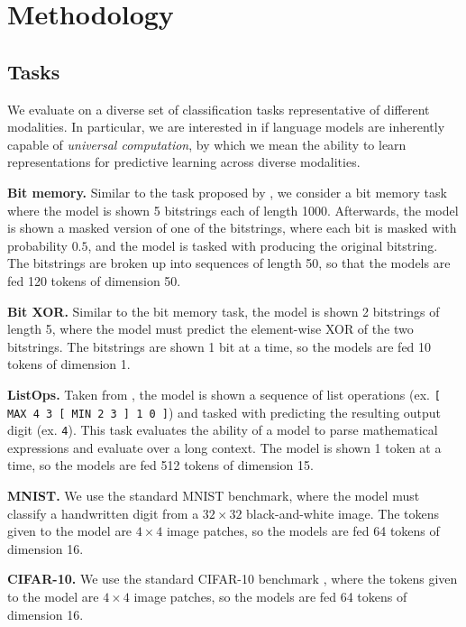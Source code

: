 
\section{Methodology}

\subsection{Tasks}
\label{sec:tasks}

We evaluate on a diverse set of classification tasks representative of different modalities.
In particular, we are interested in if language models are inherently capable of \emph{universal computation}, by which we mean the ability to learn representations for predictive learning across diverse modalities.

\textbf{Bit memory.}
Similar to the task proposed by \cite{miconi2018hebbian}, we consider a bit memory task where the model is shown 5 bitstrings each of length 1000.
Afterwards, the model is shown a masked version of one of the bitstrings, where each bit is masked with probability $0.5$, and the model is tasked with producing the original bitstring.
The bitstrings are broken up into sequences of length 50, so that the models are fed 120 tokens of dimension 50.

\textbf{Bit XOR.}
Similar to the bit memory task, the model is shown 2 bitstrings of length 5, where the model must predict the element-wise XOR of the two bitstrings.
The bitstrings are shown 1 bit at a time, so the models are fed 10 tokens of dimension 1.

\textbf{ListOps.}
Taken from \cite{tay2020lra}, the model is shown a sequence of list operations (ex. \texttt{[ MAX 4 3 [ MIN 2 3 ] 1 0 ]}) and tasked with predicting the resulting output digit (ex. \texttt{4}).
This task evaluates the ability of a model to parse mathematical expressions and evaluate over a long context.
The model is shown 1 token at a time, so the models are fed 512 tokens of dimension 15.

\textbf{MNIST.}
We use the standard MNIST benchmark, where the model must classify a handwritten digit from a $32 \times 32$ black-and-white image.
The tokens given to the model are $4 \times 4$ image patches, so the models are fed 64 tokens of dimension 16.

\textbf{CIFAR-10.}
We use the standard CIFAR-10 benchmark \citep{krizhevsky2009cifar}, where the tokens given to the model are $4 \times 4$ image patches, so the models are fed 64 tokens of dimension 16.

